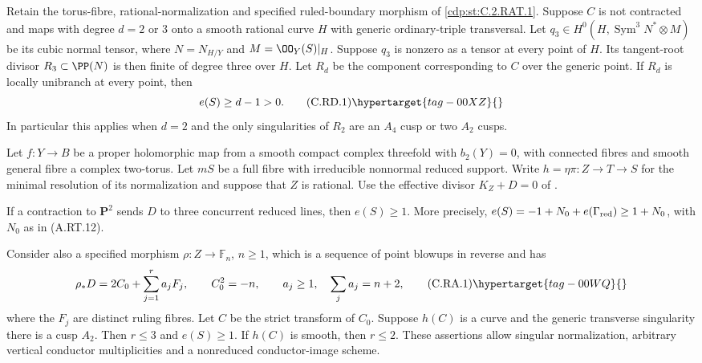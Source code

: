 
\begin{proposition}\hypertarget{tag-01CH}{}\label{cdp:st:C.2.RAT.5}


Retain the torus-fibre, rational-normalization and specified
ruled-boundary morphism of \ref{cdp:st:C.2.RAT.1}. Suppose $C$ is not
contracted and maps with degree $d=2$ or $3$ onto a smooth
rational curve $H$ with generic ordinary-triple transversal.
Let $q_3\in H^0(H,\operatorname{Sym}^3N^*\otimes M)$ be
its cubic normal tensor, where $N=N_{H/Y}$ and
$M=\OO_Y(S)|_H$. Suppose $q_3$ is nonzero as a tensor at
every point of $H$. Its tangent-root divisor
$R_3\subset\PP(N)$ is then finite of degree three over $H$.
Let $R_d$ be the component corresponding to $C$ over the
generic point. If $R_d$ is locally unibranch at every point,
then
\[
                           e(S)\ge d-1>0.
\tag{C.RD.1}\hypertarget{tag-00XZ}{}\label{cdp:eq:C.RD.1}
\]
In particular this applies when $d=2$ and the only singularities
of $R_2$ are an $A_4$ cusp or two $A_2$ cusps.
\end{proposition}

\begin{proposition}\hypertarget{tag-01CD}{}\label{cdp:st:C.2.RAT.1}


Let $f:Y\to B$ be a proper holomorphic map from a smooth compact
complex threefold with $b_2(Y)=0$, with connected fibres and smooth
general fibre a complex two-torus. Let $mS$ be a full fibre with
irreducible nonnormal reduced support. Write
$h=\eta\pi:Z\to T\to S$ for the minimal resolution of its
normalization and suppose that $Z$ is rational. Use the effective
divisor $K_Z+D=0$ of .

If a contraction to $\mathbf P^2$ sends $D$ to three concurrent
reduced lines, then $e(S)\ge1$. More precisely,
$e(S)=-1+N_0+e(\Gamma_{\rm red})\ge1+N_0$, with $N_0$ as in
(A.RT.12).

Consider also a specified morphism $\rho:Z\to\mathbb F_n$,
$n\ge1$, which is a sequence of point blowups in reverse and has
\[
 \rho_*D=2C_0+\sum_{j=1}^r a_jF_j,\qquad
 C_0^2=-n,\qquad
 a_j\ge1,\quad \sum_j a_j=n+2,                  \tag{C.RA.1}\hypertarget{tag-00WQ}{}\label{cdp:eq:C.RA.1}
\]
where the $F_j$ are distinct ruling fibres. Let $C$ be the
strict transform of $C_0$. Suppose $h(C)$ is a curve and the
generic transverse singularity there is a cusp $A_2$.
Then $r\le3$ and $e(S)\ge1$. If $h(C)$ is smooth, then
$r\le2$. These assertions allow singular normalization,
arbitrary vertical conductor multiplicities and a nonreduced
conductor-image scheme.
\end{proposition}

